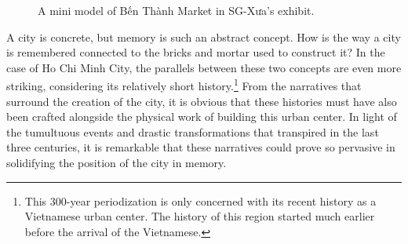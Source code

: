 \begin{figure}[!ht]
\begin{center}
\vspace{-.2 in}
\caption[\vi Sg-Xưa's Exhibit]{\vi A mini model of Bến Thành Market in SG-Xưa's exhibit.\footnotemark}\label{sgxua}
\end{center}
\vspace{-.2 in}
\end{figure}

\vi A city is concrete, but memory is such an abstract concept. How is the way a city is remembered connected to the bricks and mortar used to construct it? In the case of Ho Chi Minh City, the parallels between these two concepts are even more striking, considering its relatively short history.\footnote{This 300-year periodization is only concerned with its recent history as a Vietnamese urban center. The history of this region started much earlier before the arrival of the Vietnamese.} From the narratives that surround the creation of the city, it is obvious that these histories must have also been crafted alongside the physical work of building this urban center. In light of the tumultuous events and drastic transformations that transpired in the last three centuries, it is remarkable that these narratives could prove so pervasive in solidifying the position of the city in memory.

